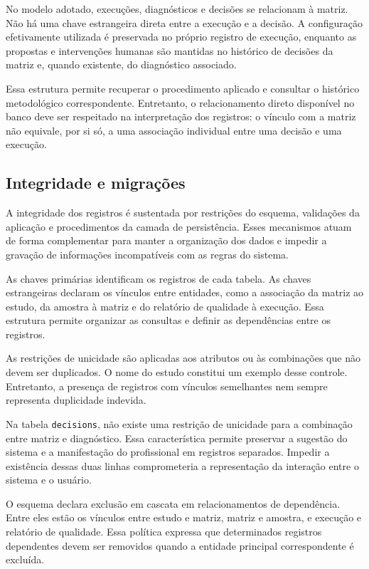 No modelo adotado, execuções, diagnósticos e decisões se relacionam à matriz. Não há uma chave estrangeira direta entre a execução e a decisão. A configuração efetivamente utilizada é preservada no próprio registro de execução, enquanto as propostas e intervenções humanas são mantidas no histórico de decisões da matriz e, quando existente, do diagnóstico associado.

Essa estrutura permite recuperar o procedimento aplicado e consultar o histórico metodológico correspondente. Entretanto, o relacionamento direto disponível no banco deve ser respeitado na interpretação dos registros: o vínculo com a matriz não equivale, por si só, a uma associação individual entre uma decisão e uma execução.

\subsection{Integridade e migrações}
\label{subsec:integridade-migracoes}

A integridade dos registros é sustentada por restrições do esquema, validações da aplicação e procedimentos da camada de persistência. Esses mecanismos atuam de forma complementar para manter a organização dos dados e impedir a gravação de informações incompatíveis com as regras do sistema.

As chaves primárias identificam os registros de cada tabela. As chaves estrangeiras declaram os vínculos entre entidades, como a associação da matriz ao estudo, da amostra à matriz e do relatório de qualidade à execução. Essa estrutura permite organizar as consultas e definir as dependências entre os registros.

As restrições de unicidade são aplicadas aos atributos ou às combinações que não devem ser duplicados. O nome do estudo constitui um exemplo desse controle. Entretanto, a presença de registros com vínculos semelhantes nem sempre representa duplicidade indevida.

Na tabela \texttt{decisions}, não existe uma restrição de unicidade para a combinação entre matriz e diagnóstico. Essa característica permite preservar a sugestão do sistema e a manifestação do profissional em registros separados. Impedir a existência dessas duas linhas comprometeria a representação da interação entre o sistema e o usuário.

O esquema declara exclusão em cascata em relacionamentos de dependência. Entre eles estão os vínculos entre estudo e matriz, matriz e amostra, e execução e relatório de qualidade. Essa política expressa que determinados registros dependentes devem ser removidos quando a entidade principal correspondente é excluída.

